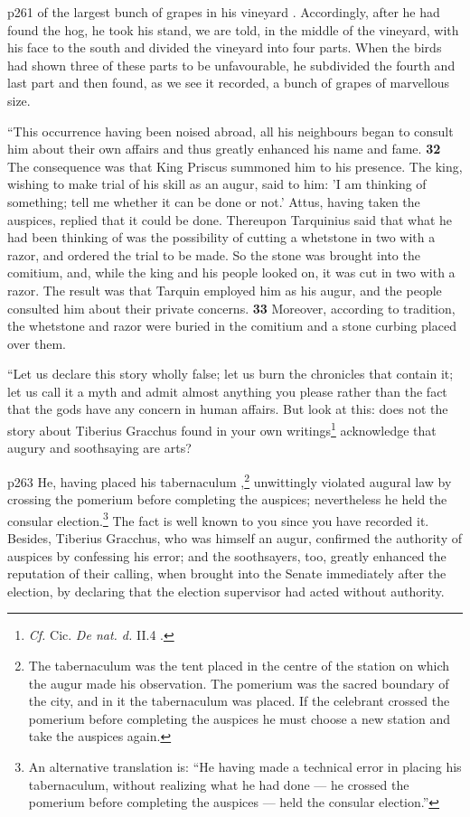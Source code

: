p261 of the largest bunch of grapes in his vineyard . Accordingly, after he had found the hog, he took his stand, we are told, in the middle of the vineyard, with his face to the south and divided the vineyard into four parts. When the birds had shown three of these parts to be unfavourable, he subdivided the fourth and last part and then found, as we see it recorded, a bunch of grapes of marvellous size.

``This occurrence having been noised abroad, all his neighbours began to consult him about their own affairs and thus greatly enhanced his name and fame. \textbf{32} The consequence was that King Priscus summoned him to his presence. The king, wishing to make trial of his skill as an augur, said to him: 'I am thinking of something; tell me whether it can be done or not.' Attus, having taken the auspices, replied that it could be done. Thereupon Tarquinius said that what he had been thinking of was the possibility of cutting a whetstone in two with a razor, and ordered the trial to be made. So the stone was brought into the comitium, and, while the king and his people looked on, it was cut in two with a razor. The result was that Tarquin employed him as his augur, and the people consulted him about their private concerns. \textbf{33} Moreover, according to tradition, the whetstone and razor were buried in the comitium and a stone curbing placed over them.

``Let us declare this story wholly false; let us burn the chronicles that contain it; let us call it a myth and admit almost anything you please rather than the fact that the gods have any concern in human affairs. But look at this: does not the story about Tiberius Gracchus found in your own writings\texthebrew{}\footnote{\emph{Cf.} Cic. \emph{De nat. d.} II.4 .

} acknowledge that augury and soothsaying are arts?

p263 He, having placed his tabernaculum ,\texthebrew{}\footnote{The tabernaculum was the tent placed in the centre of the station on which the augur made his observation. The pomerium was the sacred boundary of the city, and in it the tabernaculum was placed. If the celebrant crossed the pomerium before completing the auspices he must choose a new station and take the auspices again.

} unwittingly violated augural law by crossing the pomerium before completing the auspices; nevertheless he held the consular election.\texthebrew{}\footnote{An alternative translation is: ``He having made a technical error in pla­cing his tabernaculum, without realizing what he had done \texthebrew{—} he crossed the pomerium before completing the auspices \texthebrew{—} held the consular election.''

} The fact is well known to you since you have recorded it. Besides, Tiberius Gracchus, who was himself an augur, confirmed the authority of auspices by confessing his error; and the soothsayers, too, greatly enhanced the reputation of their calling, when brought into the Senate immediately after the election, by declaring that the election supervisor had acted without authority.

